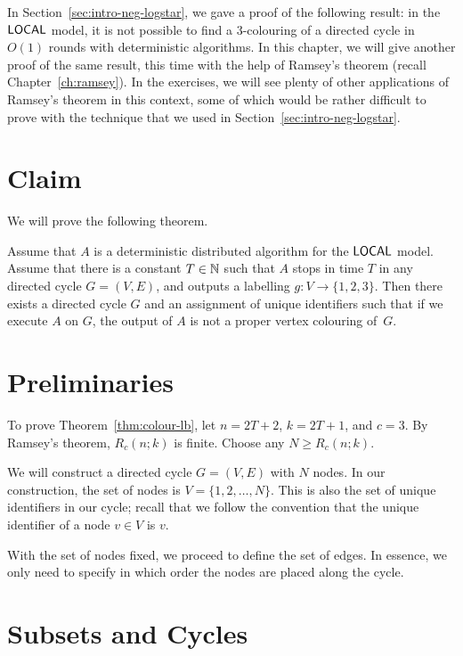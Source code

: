 
In Section~\ref{sec:intro-neg-logstar}, we gave a proof of the following result: in the $\textup{\sffamily LOCAL}$ model, it is not possible to find a $3$-colouring of a directed cycle in $O(1)$ rounds with deterministic algorithms. In this chapter, we will give another proof of the same result, this time with the help of Ramsey's theorem (recall Chapter~\ref{ch:ramsey}). In the exercises, we will see plenty of other applications of Ramsey's theorem in this context, some of which would be rather difficult to prove with the technique that we used in Section~\ref{sec:intro-neg-logstar}.


\section{Claim}

We will prove the following theorem.

\begin{theorem}\label{thm:colour-lb}
    Assume that $A$ is a deterministic distributed algorithm for the $\textup{\sffamily LOCAL}$ model. Assume that there is a constant $T \in \mathbb{N}$ such that $A$ stops in time $T$ in any directed cycle $G = (V,E)$, and outputs a labelling $g\colon V \to \{1,2,3\}$. Then there exists a directed cycle $G$ and an assignment of unique identifiers such that if we execute $A$ on $G$, the output of $A$ is not a proper vertex colouring of~$G$.
\end{theorem}


\section{Preliminaries}

To prove Theorem~\ref{thm:colour-lb}, let $n = 2T+2$, $k = 2T+1$, and $c = 3$. By Ramsey's theorem, $R_c(n;k)$ is finite. Choose any $N \ge R_c(n;k)$.

We will construct a directed cycle $G = (V,E)$ with $N$ nodes. In our construction, the set of nodes is $V = \{1,2,\dotsc,N\}$. This is also the set of unique identifiers in our cycle; recall that we follow the convention that the unique identifier of a node $v \in V$ is $v$.

With the set of nodes fixed, we proceed to define the set of edges. In essence, we only need to specify in which order the nodes are placed along the cycle.


\section{Subsets and Cycles}

